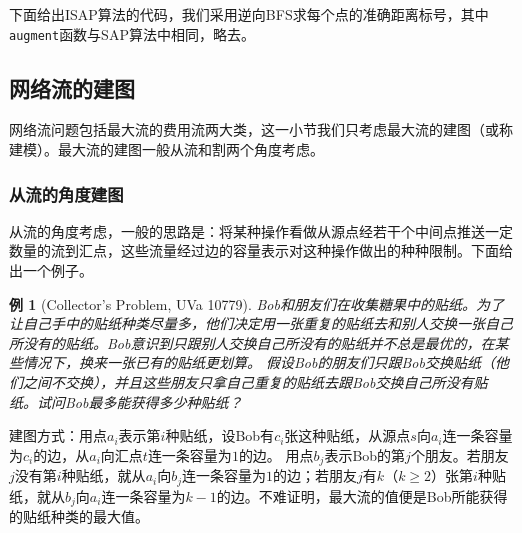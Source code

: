 \documentclass[a4paper]{ctexbook}
\newtheorem{example}{例}[chapter]
\begin{document}
  下面给出ISAP算法的代码，我们采用逆向BFS求每个点的准确距离标号，其中\texttt{augment}函数与SAP算法中相同，略去。
  
  \subsection{网络流的建图}
  网络流问题包括最大流的费用流两大类，这一小节我们只考虑最大流的建图（或称建模）。最大流的建图一般从流和割两个角度考虑。
  \subsubsection{从流的角度建图}
  从流的角度考虑，一般的思路是：将某种操作看做从源点经若干个中间点推送一定数量的流到汇点，这些流量经过边的容量表示对这种操作做出的种种限制。下面给出一个例子。
  \begin{example}[Collector's Problem, UVa 10779]
    Bob和朋友们在收集糖果中的贴纸。为了让自己手中的贴纸种类尽量多，他们决定用一张重复的贴纸去和别人交换一张自己所没有的贴纸。Bob意识到只跟别人交换自己所没有的贴纸并不总是最优的，在某些情况下，换来一张已有的贴纸更划算。
    假设Bob的朋友们只跟Bob交换贴纸（他们之间不交换），并且这些朋友只拿自己重复的贴纸去跟Bob交换自己所没有贴纸。试问Bob最多能获得多少种贴纸？
  \end{example}
  建图方式：用点$a_i$表示第$i$种贴纸，设Bob有$c_i$张这种贴纸，从源点$s$向$a_i$连一条容量为$c_i$的边，从$a_i$向汇点$t$连一条容量为$1$的边。
  用点$b_j$表示Bob的第$j$个朋友。若朋友$j$没有第$i$种贴纸，就从$a_i$向$b_j$连一条容量为$1$的边；若朋友$j$有$k$（$k\ge 2$）张第$i$种贴纸，就从$b_j$向$a_i$连一条容量为$k-1$的边。不难证明，最大流的值便是Bob所能获得的贴纸种类的最大值。
\end{document}
